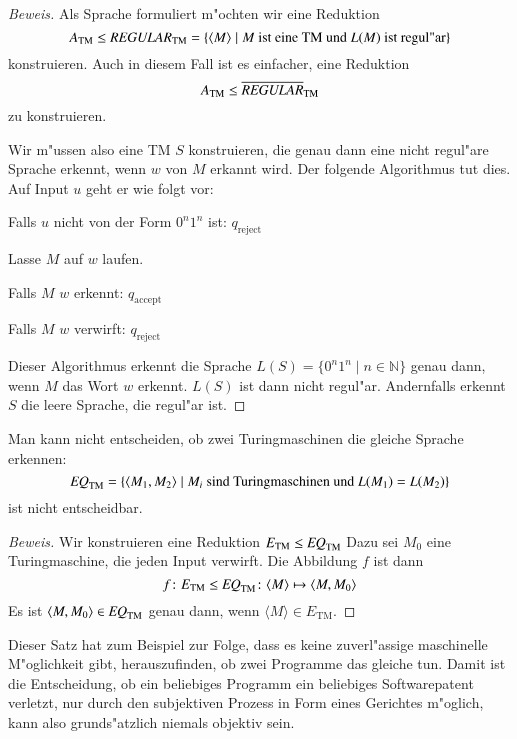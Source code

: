 \begin{proof}[Beweis]
Als Sprache formuliert m"ochten wir eine Reduktion 
\[
A_{\text{TM}}\le\text{\it REGULAR}_{\text{TM}}=\{
\langle M\rangle\;|\;\text{$M$ ist eine TM und $L(M)$ ist regul"ar}
\}
\]
konstruieren. Auch in diesem Fall ist es einfacher, eine
Reduktion
\[
A_{\text{TM}}\le\overline{\text{\it REGULAR}}_{\text{TM}}
\]
zu konstruieren.

Wir m"ussen also eine TM $S$ konstruieren, die genau
dann eine nicht regul"are Sprache erkennt, wenn $w$ von $M$ erkannt wird.
Der folgende Algorithmus tut dies. Auf Input $u$ geht er wie folgt
vor:
\medskip
\begin{compactenum}
\item Falls $u$ nicht von der Form $0^n1^n$ ist: $q_{\text{reject}}$
\item Lasse $M$ auf $w$ laufen.
\item Falls $M$ $w$ erkennt: $q_{\text{accept}}$
\item Falls $M$ $w$ verwirft: $q_{\text{reject}}$
\end{compactenum}
\medskip
Dieser Algorithmus erkennt die Sprache $L(S)=\{0^n1^n\;|\;n\in\mathbb N\}$
genau dann, wenn $M$ das Wort $w$ erkennt. $L(S)$ ist dann nicht regul"ar.
Andernfalls erkennt $S$
die leere Sprache, die regul"ar ist. 
\end{proof}

\begin{satz}
Man kann nicht entscheiden, ob zwei Turingmaschinen die gleiche Sprache
erkennen:
\[
\text{\it EQ}_{\text{TM}}=\{
\langle M_1,M_2\rangle\;|\;\text{$M_i$ sind Turingmaschinen und $L(M_1)=L(M_2)$}
\}
\]
ist nicht entscheidbar.
\end{satz}

\begin{proof}[Beweis]
Wir konstruieren eine Reduktion
$
E_{\text{TM}}\le \text{\it EQ}_{\text{TM}}
$
Dazu sei $M_0$ eine Turingmaschine, die jeden Input verwirft.
Die Abbildung $f$ ist dann
\[
f
\colon
E_{\text{TM}}\le \text{\it EQ}_{\text{TM}}
\colon
\langle M\rangle\mapsto \langle M,M_0\rangle
\]
Es ist $\langle M,M_0\rangle\in \text{\it EQ}_{\text{TM}}$
genau dann, wenn $\langle M\rangle\in E_{\text{TM}}$.
\end{proof}

Dieser Satz hat zum Beispiel zur Folge, dass es keine zuverl"assige
maschinelle
M"oglichkeit gibt, herauszufinden, ob zwei Programme das gleiche tun.
Damit ist die Entscheidung, ob ein beliebiges Programm ein beliebiges
Softwarepatent verletzt, nur durch den subjektiven Prozess in Form
eines Gerichtes m"oglich, kann also grunds"atzlich niemals objektiv sein.

